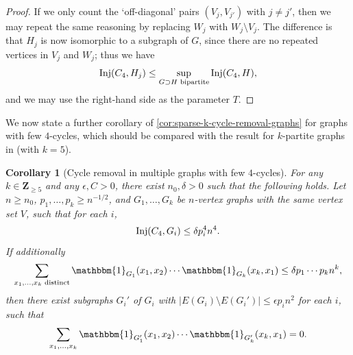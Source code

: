 \documentclass[reqno,11pt]{amsart}
\newtheorem{corollary}[theorem]{Corollary}
\theoremstyle{definition}
\theoremstyle{remark}
\numberwithin{equation}{section}
\newcommand{\Z}{\mathbf{Z}}
\newcommand{\one}{\mathbbm{1}}
\newcommand{\Hom}{\textnormal{Hom}}
\newcommand{\Inj}{\textnormal{Inj}}
\begin{document}
\begin{proof}
If we only count the `off-diagonal' pairs $(V_j, V_{j'})$ with $j \neq j'$, then we may repeat the same reasoning by replacing $W_j$ with $W_j \setminus V_j$. The difference is that $H_j$ is now isomorphic to a subgraph of $G$, since there are no repeated vertices in $V_j$ and $W_j$; thus we have
\[
    \Inj(C_4, H_j) \le \sup_{G \supset H \textnormal{ bipartite}} \Inj(C_4, H),
\]
and we may use the right-hand side as the parameter $T$.
\end{proof}

We now state a further corollary of \cref{cor:sparse-k-cycle-removal-graphs} for graphs with few $4$-cycles, which should be compared with the result for $k$-partite graphs in \cite[Theorem 1.6]{conlon2021regularity} (with $k = 5$).

\begin{corollary}[Cycle removal in multiple graphs with few $4$-cycles] \label{cor:k-cycle-removal-few-4-cycles}
For any $k \in \Z_{\ge 5}$ and any $\epsilon, C > 0$, there exist $n_0, \delta > 0$ such that the following holds. Let $n \ge n_0$, $p_1, \ldots, p_k \ge n^{-1/2}$, and $G_1, \ldots, G_k$ be $n$-vertex graphs with the same vertex set $V$, such that for each $i$,
\begin{equation} \label{eq:few-4-cycles}
    \Inj(C_4, G_i) \le \delta p_i^4 n^4.
\end{equation}
If additionally
\[
    \sum_{x_1, \ldots, x_k \text{ distinct}} \one_{G_1}(x_1, x_2) \cdots \one_{G_k}(x_k, x_1) \le \delta p_1 \cdots p_k n^k,
\]
then there exist subgraphs $G_i'$ of $G_i$ with $|E(G_i) \setminus E(G_i')| \le \epsilon p_i n^2$ for each $i$, such that
\[
    \sum_{x_1, \ldots, x_k} \one_{G_1'}(x_1, x_2) \cdots \one_{G_k'}(x_k, x_1) = 0.
\]
\end{corollary}
\end{document}

